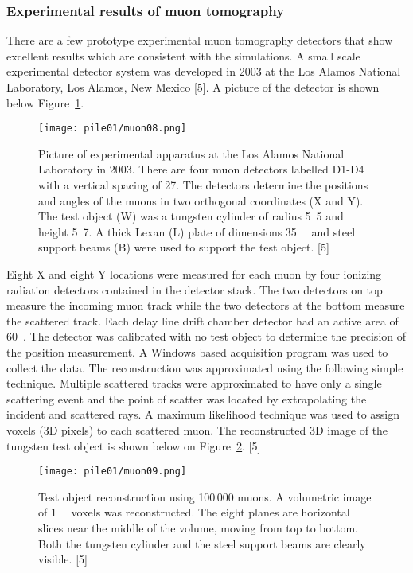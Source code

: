 \documentclass[twocolumn,a4paper]{article}
\begin{document}
\subsubsection{Experimental results of muon tomography}
There are a few prototype experimental muon tomography detectors that show excellent results
which are consistent with the simulations.
A small scale experimental detector system was developed in 2003 at the Los Alamos National
Laboratory, Los Alamos, New Mexico [5]. A picture of the detector is shown below Figure~\ref{muon08}.

\begin{figure}
  \texttt{[image: pile01/muon08.png]}
  \caption{Picture of experimental apparatus at the Los Alamos National Laboratory in 2003. There
are four muon detectors labelled D1-D4 with a vertical spacing of \unit{27}{\centi\metre}. The detectors determine
the positions and angles of the muons in two orthogonal coordinates (X and Y). The test object (W)
was a tungsten cylinder of radius \unit{5.5}{\centi\metre} and height \unit{5.7}{\centi\metre}. A thick Lexan (L) plate of dimensions
\unit{35}{\cubic{\centi\metre}} and steel support beams (B) were used to support the test object. [5]}
  \label{muon08}
\end{figure}

Eight X and eight Y locations were measured for each muon by four ionizing radiation detectors
contained in the detector stack. The two detectors on top measure the incoming muon track while
the two detectors at the bottom measure the scattered track. Each delay line drift chamber detector
had an active area of \unit{60}{\square{\centi\metre}}. The detector was calibrated with no test object to determine the
precision of the position measurement. A Windows based acquisition program was used to collect
the data. The reconstruction was approximated using the following simple technique. Multiple
scattered tracks were approximated to have only a single scattering event and the point of scatter
was located by extrapolating the incident and scattered rays. A maximum likelihood technique was
used to assign voxels (3D pixels) to each scattered muon. The reconstructed 3D image of the
tungsten test object is shown below on Figure~\ref{muon09}. [5]

\begin{figure}
  \texttt{[image: pile01/muon09.png]}
  \caption{Test object reconstruction using 100\,000 muons. A volumetric image of \unit{1}{\cubic{\centi\metre}} voxels
was reconstructed. The eight planes are horizontal slices near the middle of the volume, moving
from top to bottom. Both the tungsten cylinder and the steel support beams are clearly visible. [5]}
  \label{muon09}
\end{figure}
\end{document}
